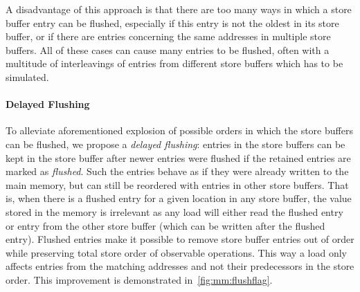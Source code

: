 A disadvantage of this approach is that there are too many ways in which a store
buffer entry can be flushed, especially if this entry is not the oldest in its
store buffer, or if there are entries concerning the same addresses in multiple store buffers.
All of these cases can cause many entries to be flushed, often with a multitude of interleavings of entries from different store buffers which has to be simulated.

\paragraph{Delayed Flushing} %
To alleviate aforementioned explosion of possible orders in which the store
buffers can be flushed, we propose a \emph{delayed flushing}: entries in the
store buffers can be kept in the store buffer after newer entries were flushed
if the retained entries are marked as \emph{flushed}.
Such the entries behave as if they were already written to the main memory, but can still be reordered with entries in other store buffers.
That is, when there is a flushed entry for a given location in any store buffer, the value stored in the memory is irrelevant as any load will either read the flushed entry or entry from the other store buffer (which can be written after the flushed entry).
Flushed entries make it possible to remove store buffer entries out of order while preserving total store order of observable operations.
This way a load only affects entries from the matching addresses and not their predecessors in the store order.
This improvement is demonstrated in~\autoref{fig:mm:flushflag}.


